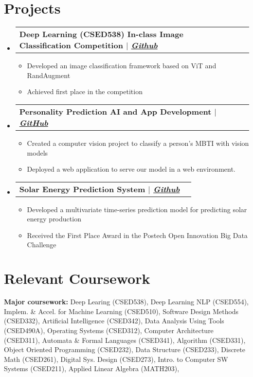 \documentclass[letterpaper,11pt]{article}
\makeatletter
\newcommand{\resumeItem}[1]{
  \item\small{
    {#1 \vspace{-2pt}}
  }
}
\newcommand{\resumeProjectHeading}[1]{
  \vspace{-2pt}\item
    \begin{tabular*}{0.97\textwidth}[t]{l@{\extracolsep{\fill}}r}
      \textbf{#1} \\
    \end{tabular*}\vspace{-7pt}
}
\newcommand{\resumeSubHeadingListStart}{\begin{itemize}[leftmargin=0.15in, label={}]}
\newcommand{\resumeSubHeadingListEnd}{\end{itemize}}
\newcommand{\resumeItemListStart}{\begin{itemize}}
\newcommand{\resumeItemListEnd}{\end{itemize}\vspace{-5pt}}
\makeatother
\begin{document}

\section{Projects}
\vspace{3pt}
\resumeSubHeadingListStart

\resumeProjectHeading
{\textbf{Deep Learning (CSED538) In-class Image Classification Competition} $|$ \emph{\href{https://github.com/happyhappy-jun/CSED538-final-project}{Github}}}
\resumeItemListStart
\resumeItem{Developed an image classification framework based on ViT and RandAugment}
\resumeItem{Achieved first place in the competition}
\resumeItemListEnd


\resumeProjectHeading
{\textbf{Personality Prediction AI and App Development} $|$ \emph{\href{https://github.com/hhyy0401/UGRP}{GitHub}}}
\resumeItemListStart
\resumeItem{Created a computer vision project to classify a person's MBTI with vision models}
\resumeItem{Deployed a web application to serve our model in a web environment.}
\resumeItemListEnd

\resumeProjectHeading
{\textbf{Solar Energy Prediction System} $|$ \emph{\href{https://github.com/happyhappy-jun/2020-Postech-Open-innovation-Bigdata-Challenge}{Github}}}
\resumeItemListStart
\resumeItem{Developed a multivariate time-series prediction model for predicting solar energy production}
\resumeItem{Received the First Place Award in the Postech Open Innovation Big Data Challenge}
\resumeItemListEnd
\resumeSubHeadingListEnd








\section{Relevant Coursework}
\vspace{3pt}
\resumeSubHeadingListStart
\small{\item{
              \textbf{Major coursework:}{
                Deep Learing (CSED538),
                Deep Learning NLP (CSED554),
                Implem. \& Accel. for Machine Learning (CSED510),
                Software Design Methods (CSED332),
                Artificial Intelligence (CSED342),
                Data Analysis Using Tools (CSED490A),
                Operating Systems (CSED312),
                Computer Architecture (CSED311),
                Automata \& Formal Languages (CSED341),
                Algorithm (CSED331),
                Object Oriented Programming (CSED232),
                Data Structure (CSED233),
                Discrete Math (CSED261),
                Digital Sys. Design (CSED273),
                Intro. to Computer SW Systems (CSED211),
                Applied Linear Algebra (MATH203),
              }
        }}
\resumeSubHeadingListEnd
\end{document}
